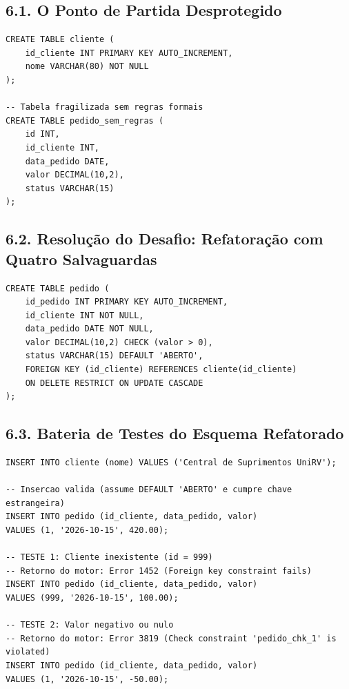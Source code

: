 \subsection*{6.1. O Ponto de Partida Desprotegido}

\begin{lstlisting}
CREATE TABLE cliente (
    id_cliente INT PRIMARY KEY AUTO_INCREMENT,
    nome VARCHAR(80) NOT NULL
);

-- Tabela fragilizada sem regras formais
CREATE TABLE pedido_sem_regras (
    id INT,
    id_cliente INT,
    data_pedido DATE,
    valor DECIMAL(10,2),
    status VARCHAR(15)
);
\end{lstlisting}

\subsection*{6.2. Resolução do Desafio: Refatoração com Quatro Salvaguardas}

\begin{lstlisting}
CREATE TABLE pedido (
    id_pedido INT PRIMARY KEY AUTO_INCREMENT,
    id_cliente INT NOT NULL,
    data_pedido DATE NOT NULL,
    valor DECIMAL(10,2) CHECK (valor > 0),
    status VARCHAR(15) DEFAULT 'ABERTO',
    FOREIGN KEY (id_cliente) REFERENCES cliente(id_cliente)
    ON DELETE RESTRICT ON UPDATE CASCADE
);
\end{lstlisting}

\subsection*{6.3. Bateria de Testes do Esquema Refatorado}

\begin{lstlisting}
INSERT INTO cliente (nome) VALUES ('Central de Suprimentos UniRV');

-- Insercao valida (assume DEFAULT 'ABERTO' e cumpre chave estrangeira)
INSERT INTO pedido (id_cliente, data_pedido, valor)
VALUES (1, '2026-10-15', 420.00);

-- TESTE 1: Cliente inexistente (id = 999)
-- Retorno do motor: Error 1452 (Foreign key constraint fails)
INSERT INTO pedido (id_cliente, data_pedido, valor)
VALUES (999, '2026-10-15', 100.00);

-- TESTE 2: Valor negativo ou nulo
-- Retorno do motor: Error 3819 (Check constraint 'pedido_chk_1' is violated)
INSERT INTO pedido (id_cliente, data_pedido, valor)
VALUES (1, '2026-10-15', -50.00);
\end{lstlisting}

